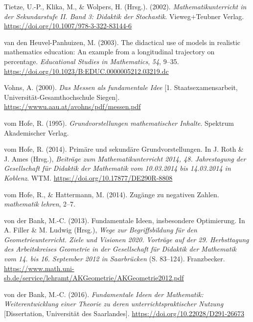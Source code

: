 \documentclass[
]{scrbook}
\newlength{\cslhangindent}
\newlength{\cslentryspacingunit} %
\newenvironment{CSLReferences}[2] %
 {%
  \setlength{\parindent}{0pt}
  \ifodd #1
  \let\oldpar\par
  \def\par{\hangindent=\cslhangindent\oldpar}
  \fi
  \setlength{\parskip}{#2\cslentryspacingunit}
 }%
 {}
\theoremstyle{definition}
\theoremstyle{definition}
\theoremstyle{definition}
\theoremstyle{definition}
\theoremstyle{remark}
\begin{document}
\begin{CSLReferences}{1}{0}
\leavevmode{}%
Tietze, U.-P., Klika, M., \& Wolpers, H. (Hrsg.). (2002). \emph{Mathematikunterricht in der {Sekundarstufe} {II}. {Band} 3: {Didaktik} der {Stochastik}}. Vieweg+Teubner Verlag. \url{https://doi.org/10.1007/978-3-322-83144-6}

\leavevmode{}%
van den Heuvel-Panhuizen, M. (2003). The didactical use of models in realistic mathematics education: {An} example from a longitudinal trajectory on percentage. \emph{Educational Studies in Mathematics}, \emph{54}, 9--35. \url{https://doi.org/10.1023/B:EDUC.0000005212.03219.dc}

\leavevmode{}%
Vohns, A. (2000). \emph{Das {Messen} als fundamentale {Idee}} {[}1. Staatsexamensarbeit, Universität-Gesamthochschule Siegen{]}. \url{https://wwwu.aau.at/avohns/pdf/messen.pdf}

\leavevmode{}%
vom Hofe, R. (1995). \emph{Grundvorstellungen mathematischer {Inhalte}}. Spektrum Akademischer Verlag.

\leavevmode{}%
vom Hofe, R. (2014). Primäre und sekundäre {Grundvorstellungen}. In J. Roth \& J. Ames (Hrsg.), \emph{Beiträge zum {Mathematikunterricht} 2014, 48. {Jahrestagung} der {Gesellschaft} für {Didaktik} der {Mathematik} vom 10.03.2014 bis 14.03.2014 in {Koblenz}}. WTM. \url{https://doi.org/10.17877/DE290R-8808}

\leavevmode{}%
vom Hofe, R., \& Hattermann, M. (2014). Zugänge zu negativen {Zahlen}. \emph{mathematik lehren}, 2--7.

\leavevmode{}%
von der Bank, M.-C. (2013). Fundamentale {Ideen}, insbesondere {Optimierung}. In A. Filler \& M. Ludwig (Hrsg.), \emph{Wege zur {Begriffsbildung} für den {Geometrieunterricht}. {Ziele} und {Visionen} 2020. {Vorträge} auf der 29. {Herbsttagung} des {Arbeitskreises} {Geometrie} in der {Gesellschaft} für {Didaktik} der {Mathematik} vom 14. bis 16. {September} 2012 in {Saarbrücken}} (S. 83--124). Franzbecker. \url{https://www.math.uni-sb.de/service/lehramt/AKGeometrie/AKGeometrie2012.pdf}

\leavevmode{}%
von der Bank, M.-C. (2016). \emph{Fundamentale {Ideen} der {Mathematik}: {Weiterentwicklung} einer {Theorie} zu deren unterrichtspraktischer {Nutzung}} {[}Dissertation, Universität des Saarlandes{]}. \url{https://doi.org/10.22028/D291-26673}


\end{CSLReferences}
\end{document}

